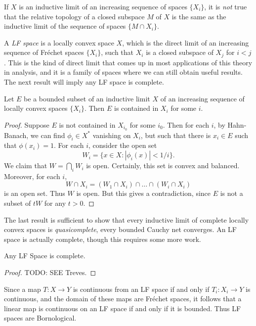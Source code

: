 \begin{remark}
    If $X$ is an inductive limit of an increasing sequence of spaces $\{ X_i \}$, it is \emph{not} true that the relative topology of a closed subspace $M$ of $X$ is the same as the inductive limit of the sequence of spaces $\{ M \cap X_i \}$.
\end{remark}

A \emph{LF space} is a locally convex space $X$, which is the direct limit of an increasing sequence of Fr\'{e}chet spaces $\{ X_i \}$, such that $X_i$ is a closed subspace of $X_j$ for $i < j$. This is the kind of direct limit that comes up in most applications of this theory in analysis, and it is a family of spaces where we can still obtain useful results. The next result will imply any LF space is complete.

\begin{lemma}
    Let $E$ be a bounded subset of an inductive limit $X$ of an increasing sequence of locally convex spaces $\{ X_i \}$. Then $E$ is contained in $X_i$ for some $i$.
\end{lemma}
\begin{proof}
    Suppose $E$ is not contained in $X_{i_0}$ for some $i_0$. Then for each $i$, by Hahn-Banach, we can find $\phi_i \in X^*$ vanishing on $X_i$, but such that there is $x_i \in E$ such that $\phi(x_i) = 1$. For each $i$, consider the open set
    \[ W_i = \{ x \in X : |\phi_i(x)| < 1/i \}. \]
    We claim that $W = \bigcap_i W_i$ is open. Certainly, this set is convex and balanced. Moreover, for each $i$,
    \[ W \cap X_i = (W_1 \cap X_i) \cap \dots \cap (W_i \cap X_i) \]
    is an open set. Thus $W$ is open. But this gives a contradiction, since $E$ is not a subset of $tW$ for any $t > 0$.
\end{proof}

The last result is sufficient to show that every inductive limit of complete locally convex spaces is \emph{quasicomplete}, every bounded Cauchy net converges. An LF space is actually complete, though this requires some more work.

\begin{theorem}
    Any LF Space is complete.
\end{theorem}
\begin{proof}
    TODO: SEE Treves.
\end{proof}

Since a map $T: X \to Y$ is continuous from an LF space if and only if $T_i: X_i \to Y$ is continuous, and the domain of these maps are Fr\'{e}chet spaces, it follows that a linear map is continuous on an LF space if and only if it is bounded. Thus LF spaces are Bornological.

